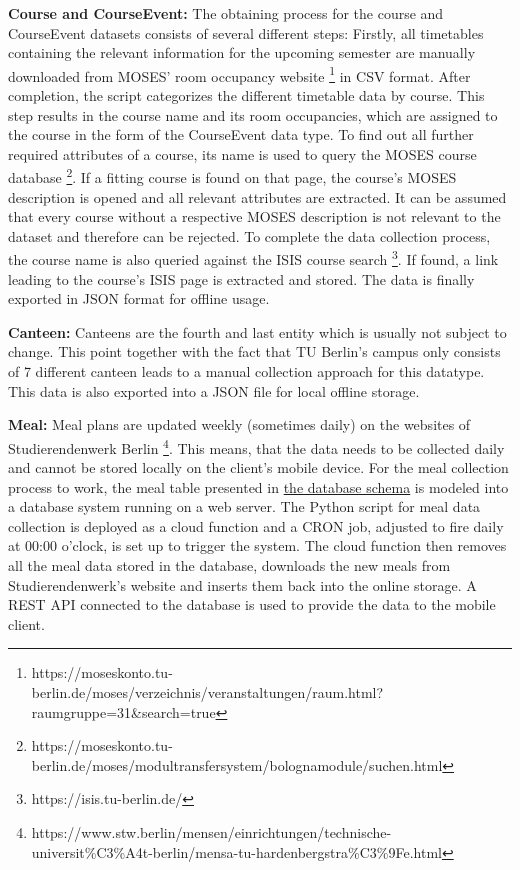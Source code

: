 \textbf{Course and CourseEvent:} The obtaining process for the course and CourseEvent datasets consists of several different steps: Firstly, all timetables containing the relevant information for the upcoming semester are manually downloaded from MOSES' room occupancy website \footnote{https://moseskonto.tu-berlin.de/moses/verzeichnis/veranstaltungen/raum.html?raumgruppe=31\&search=true} in CSV format. After completion, the script categorizes the different timetable data by course. This step results in the course name and its room occupancies, which are assigned to the course in the form of the CourseEvent data type. To find out all further required attributes of a course, its name is used to query the MOSES course database \footnote{https://moseskonto.tu-berlin.de/moses/modultransfersystem/bolognamodule/suchen.html}. If a fitting course is found on that page, the course's MOSES description is opened and all relevant attributes are extracted. It can be assumed that every course without a respective MOSES description is not relevant to the dataset and therefore can be rejected. To complete the data collection process, the course name is also queried against the ISIS course search \footnote{https://isis.tu-berlin.de/}. If found, a link leading to the course's ISIS page is extracted and stored. The data is finally exported in JSON format for offline usage.

\textbf{Canteen:} Canteens are the fourth and last entity which is usually not subject to change. This point together with the fact that TU Berlin's campus only consists of 7 different canteen leads to a manual collection approach for this datatype. This data is also exported into a JSON file for local offline storage.

\textbf{Meal:} Meal plans are updated weekly (sometimes daily) on the websites of Studierendenwerk Berlin \footnote{https://www.stw.berlin/mensen/einrichtungen/technische-universit\%C3\%A4t-berlin/mensa-tu-hardenbergstra\%C3\%9Fe.html}. This means, that the data needs to be collected daily and cannot be stored locally on the client's mobile device. For the meal collection process to work, the meal table presented in \hyperref[fig:database_schema]{the database schema} is modeled into a database system running on a web server. The Python script for meal data collection is deployed as a cloud function and a CRON job, adjusted to fire daily at 00:00 o'clock, is set up to trigger the system. The cloud function then removes all the meal data stored in the database, downloads the new meals from Studierendenwerk's website and inserts them back into the online storage. A REST API connected to the database is used to provide the data to the mobile client.

